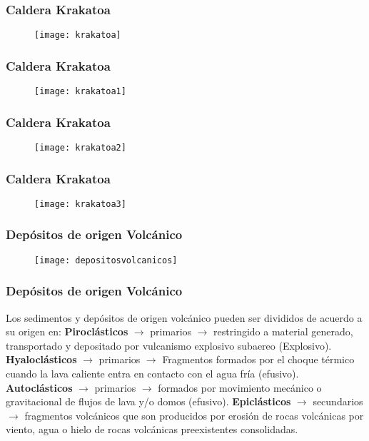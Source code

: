 \documentclass{beamer}
\begin{document}
\begin{frame}
\frametitle{Caldera Krakatoa}
\begin{figure}
\begin{center}
\texttt{[image: krakatoa]}
\end{center}
\end{figure}
\end{frame}
\begin{frame}
\frametitle{Caldera Krakatoa}
\begin{figure}
\begin{center}
\texttt{[image: krakatoa1]}
\end{center}
\end{figure}
\end{frame}
\begin{frame}
\frametitle{Caldera Krakatoa}
\begin{figure}
\begin{center}
\texttt{[image: krakatoa2]}
\end{center}
\end{figure}
\end{frame}
\begin{frame}
\frametitle{Caldera Krakatoa}
\begin{figure}
\begin{center}
\texttt{[image: krakatoa3]}
\end{center}
\end{figure}
\end{frame}
\begin{frame}
\frametitle{Depósitos de origen Volcánico}
\begin{figure}
\begin{center}
\texttt{[image: depositosvolcanicos]}
\end{center}
\end{figure}
\end{frame}
\begin{frame}
\frametitle{Depósitos de origen Volcánico}
\justifying
Los sedimentos y depósitos de origen volcánico pueden ser divididos de acuerdo a su origen en:\vfill
\textbf{Piroclásticos} $\rightarrow$ primarios $\rightarrow$ restringido a material generado, transportado y depositado por vulcanismo explosivo subaereo (Explosivo).\vfill
\textbf{Hyaloclásticos} $\rightarrow$ primarios $\rightarrow$ Fragmentos formados por el choque térmico cuando la lava caliente entra en contacto con el agua fría (efusivo).\vfill
\textbf{Autoclásticos} $\rightarrow$ primarios $\rightarrow$ formados por movimiento mecánico o gravitacional de flujos de lava y/o domos (efusivo).\vfill
\textbf{Epiclásticos} $\rightarrow$ secundarios $\rightarrow$ fragmentos volcánicos que son producidos por erosión de rocas volcánicas por viento, agua o hielo de rocas volcánicas preexistentes consolidadas.
\end{frame}
\end{document}
